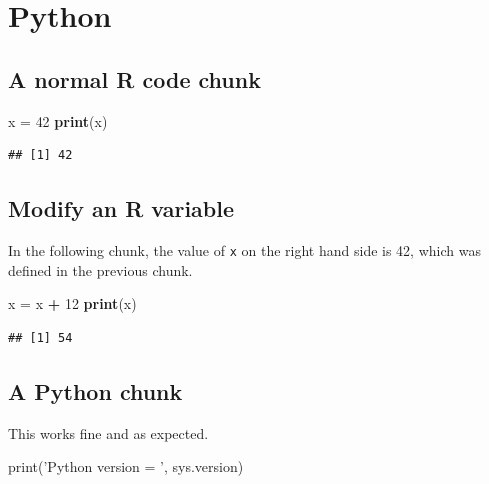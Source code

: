 \documentclass[]{book}
\newenvironment{Shaded}{\begin{snugshade}}{\end{snugshade}}
\newcommand{\BuiltInTok}[1]{#1}
\newcommand{\DecValTok}[1]{\textcolor[rgb]{0.00,0.00,0.81}{#1}}
\newcommand{\KeywordTok}[1]{\textcolor[rgb]{0.13,0.29,0.53}{\textbf{#1}}}
\newcommand{\NormalTok}[1]{#1}
\newcommand{\OperatorTok}[1]{\textcolor[rgb]{0.81,0.36,0.00}{\textbf{#1}}}
\newcommand{\StringTok}[1]{\textcolor[rgb]{0.31,0.60,0.02}{#1}}
\begin{document}
\hypertarget{python}{%
\chapter{Python}\label{python}}

\hypertarget{a-normal-r-code-chunk}{%
\section{A normal R code chunk}\label{a-normal-r-code-chunk}}

\begin{Shaded}
\begin{Highlighting}[]
\NormalTok{x =}\StringTok{ }\DecValTok{42}
\KeywordTok{print}\NormalTok{(x)}
\end{Highlighting}
\end{Shaded}

\begin{verbatim}
## [1] 42
\end{verbatim}

\hypertarget{modify-an-r-variable}{%
\section{Modify an R variable}\label{modify-an-r-variable}}

In the following chunk, the value of \texttt{x} on the right hand side
is 42, which was defined in the previous chunk.

\begin{Shaded}
\begin{Highlighting}[]
\NormalTok{x =}\StringTok{ }\NormalTok{x }\OperatorTok{+}\StringTok{ }\DecValTok{12}
\KeywordTok{print}\NormalTok{(x)}
\end{Highlighting}
\end{Shaded}

\begin{verbatim}
## [1] 54
\end{verbatim}

\hypertarget{a-python-chunk}{%
\section{A Python chunk}\label{a-python-chunk}}

This works fine and as expected.

\begin{Shaded}
\begin{Highlighting}[]
\BuiltInTok{print}\NormalTok{(}\StringTok{'Python version = '}\NormalTok{, sys.version)}
\end{Highlighting}
\end{Shaded}
\end{document}
